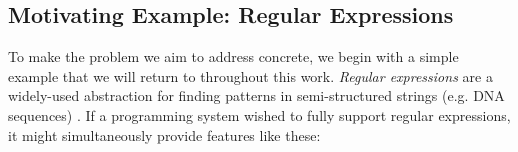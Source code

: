 \subsection{Motivating Example: Regular Expressions}\label{regex}
To make the problem we aim to address concrete, we begin with a simple example that we will return to throughout this work. \emph{Regular expressions} are a widely-used abstraction for finding patterns in semi-structured strings (e.g. DNA sequences) \cite{Thompson:1968:PTR:363347.363387}. If a programming system wished to fully support regular expressions, it might simultaneously provide features like these:

